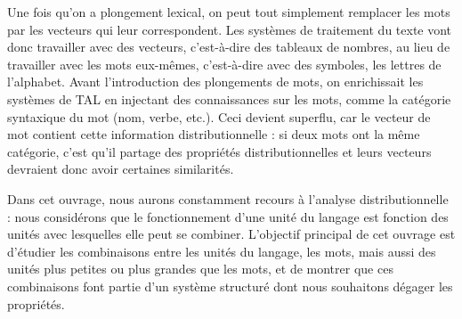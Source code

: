 {Une fois qu’on a plongement lexical, on peut tout simplement remplacer les mots par les vecteurs qui leur correspondent. Les systèmes de traitement du texte vont donc travailler avec des vecteurs, c’est-à-dire des tableaux de nombres, au lieu de travailler avec les mots eux-mêmes, c’est-à-dire avec des symboles, les lettres de l’alphabet. Avant l’introduction des plongements de mots, on enrichissait les systèmes de TAL en injectant des connaissances sur les mots, comme la catégorie syntaxique du mot (nom, verbe, etc.). Ceci devient superflu, car le vecteur de mot contient cette information distributionnelle : si deux mots ont la même catégorie, c’est qu’il partage des propriétés distributionnelles et leurs vecteurs devraient donc avoir certaines similarités.

Dans cet ouvrage, nous aurons constamment recours à l’analyse distributionnelle : nous considérons que le fonctionnement d’une unité du langage est fonction des unités avec lesquelles elle peut se combiner. L’objectif principal de cet ouvrage est d’étudier les combinaisons entre les unités du langage, les mots, mais aussi des unités plus petites ou plus grandes que les mots, et de montrer que ces combinaisons font partie d’un système structuré dont nous souhaitons dégager les propriétés.}


